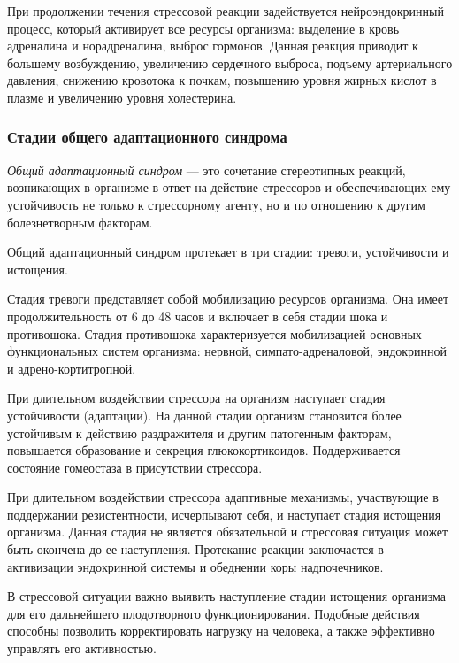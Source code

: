 При продолжении течения стрессовой реакции задействуется нейроэндокринный процесс, который активирует все ресурсы организма: выделение в кровь адреналина и норадреналина, выброс гормонов. Данная реакция приводит к большему возбуждению, увеличению сердечного выброса, подъему артериального давления, снижению кровотока к почкам, повышению уровня жирных кислот в плазме и увеличению уровня холестерина. \cite{neuroPhysicalMechasmsOfStress}

\subsubsection{Стадии общего адаптационного синдрома}

\textit{Общий адаптационный синдром} --- это сочетание стереотипных реакций, возникающих в организме в ответ на действие стрессоров и обеспечивающих ему устойчивость не только к стрессорному агенту, но и по отношению к другим болезнетворным факторам. \cite{stressAndPatology}

Общий адаптационный синдром протекает в три стадии: тревоги, устойчивости и истощения.

Стадия тревоги представляет собой мобилизацию ресурсов организма. Она имеет продолжительность от 6 до 48 часов и включает в себя стадии шока и противошока. Стадия противошока характеризуется мобилизацией основных функциональных систем организма: нервной, симпато-адреналовой, эндокринной и адрено-кортитропной. \cite{stressAndPatology}

При длительном воздействии стрессора на организм наступает стадия ус\-тойчивости (адаптации). На данной стадии организм становится более устойчивым к действию раздражителя и другим патогенным факторам, повышается образование и секреция глюкокортикоидов. Поддерживается состояние гомеостаза в присутствии стрессора. \cite{stressAndPatology}

При длительном воздействии стрессора адаптивные механизмы, участвующие в поддержании резистентности, исчерпывают себя, и наступает стадия истощения организма. Данная стадия не является обязательной и стрессовая ситуация может быть окончена до ее наступления. Протекание реакции заключается в активизации эндокринной системы и обеднении коры надпочечников. \cite{stressAndPatology}

В стрессовой ситуации важно выявить наступление стадии истощения организма для его дальнейшего плодотворного функционирования. Подобные действия способны позволить корректировать нагрузку на человека, а также эффективно управлять его активностью.

